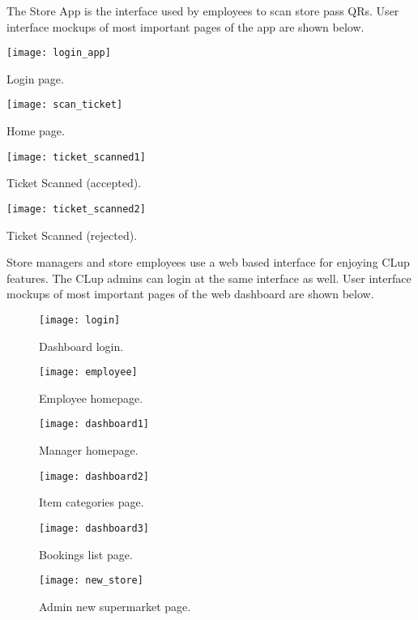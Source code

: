 \clearpage
The Store App is the interface used by employees to scan store pass QRs.
User interface mockups of most important pages of the app are shown below.
\vspace{0.5cm}

\begin{minipage}{.5\textwidth}
	\centering
	\texttt{[image: login\_app]}
	\captionsetup{type=figure}
	\caption{Login page.}
\end{minipage}%
\begin{minipage}{.5\textwidth}
	\centering
	\texttt{[image: scan\_ticket]}
	\captionsetup{type=figure}
	\caption{Home page.}
\end{minipage}

\vspace{1cm}

\begin{minipage}{.5\textwidth}
	\centering
	\texttt{[image: ticket\_scanned1]}
	\captionsetup{type=figure}
	\caption{Ticket Scanned (accepted).}
\end{minipage}%
\begin{minipage}{.5\textwidth}
	\centering
	\texttt{[image: ticket\_scanned2]}
	\captionsetup{type=figure}
	\caption{Ticket Scanned (rejected).}
\end{minipage}

\clearpage

Store managers and store employees use a web based interface for enjoying CLup features. The CLup admins can login at the same interface as well.
User interface mockups of most important pages of the web dashboard are shown below.
\vspace{0.5cm}
\begin{figure}[H]
	\centering
	\texttt{[image: login]}
	\caption{Dashboard login.}
\end{figure}
\begin{figure}[H]
	\centering
	\texttt{[image: employee]}
	\caption{Employee homepage.}
\end{figure}
\begin{figure}[H]
	\centering
	\texttt{[image: dashboard1]}
	\caption{Manager homepage.}
\end{figure}
\begin{figure}[H]
	\centering
	\texttt{[image: dashboard2]}
	\caption{Item categories page.}
\end{figure}
\begin{figure}[H]
	\centering
	\texttt{[image: dashboard3]}
	\caption{Bookings list page.}
\end{figure}
\begin{figure}[H]
	\centering
	\texttt{[image: new\_store]}
	\caption{Admin new supermarket page.}
\end{figure}